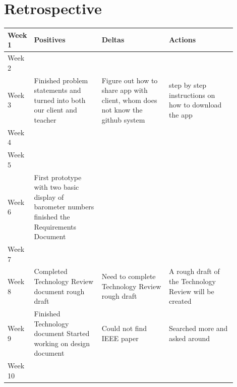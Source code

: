 \documentclass[onecolumn, draftclsnofoot,10pt, compsoc]{IEEEtran}
\begin{document}
\section{Retrospective}
\begin{center}
	\begin{tabular}{| l | p{0.3\linewidth} | p{0.3\linewidth} | p{0.3\linewidth} |}
		\hline
		Week 1 & Positives & Deltas & Actions \\ \hline
		Week 2 & & & \\ \hline				%
		Week 3 & Finished problem statements and turned into both our client and teacher
 & Figure out how to share app with client, whom does not know the github system
 & step by step instructions on how to download the app \\ \hline
		Week 4 & & & \\ \hline
		Week 5 & & & \\ \hline
		Week 6 &First prototype with two basic display of barometer numbers
  finished the Requirements Document & & \\ \hline
		Week 7 & & & \\ \hline
		Week 8 & Completed Technology Review document rough draft & Need to complete Technology Review rough draft & A rough draft of the Technology Review will be created \\ \hline
		Week 9 &Finished Technology document
Started working on design document
 & Could not find IEEE paper & Searched more and asked around\\ \hline
		Week 10 & & & \\ \hline




	\end{tabular}
\end{center}
\end{document}
